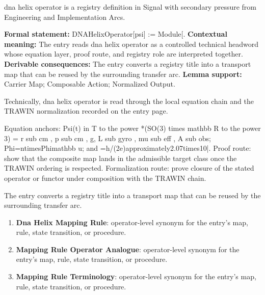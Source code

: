 
\begingroup\small
{}
dna helix operator is a registry definition in Signal with secondary pressure from Engineering and Implementation Arcs.

\begingroup\footnotesize\setlength{\emergencystretch}{3em}\sloppy
\textbf{Formal statement:} DNAHelixOperator[psi] := Module[. \textbf{Contextual meaning:} The entry reads dna helix operator as a controlled technical headword whose equation layer, proof route, and registry role are interpreted together. \textbf{Derivable consequences:} The entry converts a registry title into a transport map that can be reused by the surrounding transfer arc. \textbf{Lemma support:} Carrier Map; Composable Action; Normalized Output.\par
\endgroup

Technically, dna helix operator is read through the local equation chain and the TRAWIN normalization recorded on the entry page.

Equation anchors: Psi(t) in T to the power *(SO(3) times mathbb R to the power 3) = r sub cm , p sub cm , g, L sub gyro , mu sub eff , A sub obs; Phi=ntimesPhimathbb u; and =h/(2e)approximately2.07times10|. Proof route: show that the composite map lands in the admissible target class once the TRAWIN ordering is respected. Formalization route: prove closure of the stated operator or functor under composition with the TRAWIN chain.

The entry converts a registry title into a transport map that can be reused by the surrounding transfer arc.
\endgroup

\begin{enumerate}[leftmargin=1.6em,itemsep=6pt,topsep=4pt]
\item \textbf{Dna Helix Mapping Rule}: operator-level synonym for the entry's map, rule, state transition, or procedure.
\item \textbf{Mapping Rule Operator Analogue}: operator-level synonym for the entry's map, rule, state transition, or procedure.
\item \textbf{Mapping Rule Terminology}: operator-level synonym for the entry's map, rule, state transition, or procedure.
\end{enumerate}

